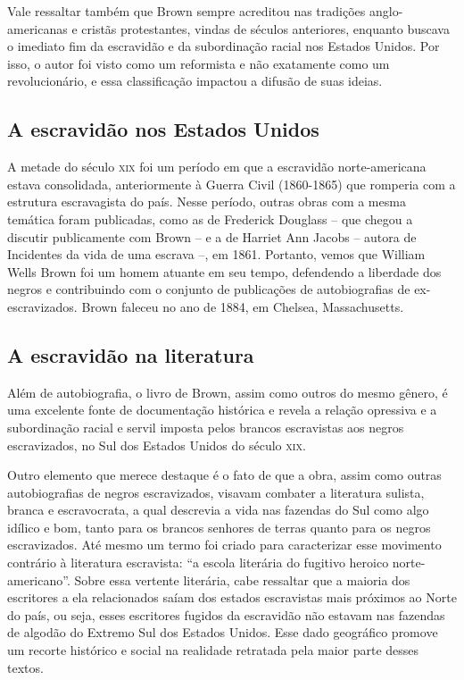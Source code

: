\documentclass[11pt]{extarticle}
\begin{document}
\begin{enumerate}
Vale ressaltar também que Brown sempre acreditou nas tradições
anglo-americanas e cristãs protestantes, vindas de séculos anteriores,
enquanto buscava o imediato fim da escravidão e da subordinação racial
nos Estados Unidos. Por isso, o autor foi visto como um reformista e não
exatamente como um revolucionário, e essa classificação impactou a
difusão de suas ideias.


\subsection{A escravidão nos Estados Unidos}

A metade do século \textsc{xix} foi um período em que a escravidão
norte-americana estava consolidada, anteriormente à Guerra Civil
(1860-1865) que romperia com a estrutura escravagista do país. Nesse
período, outras obras com a mesma temática foram publicadas, como as de
Frederick Douglass -- que chegou a discutir publicamente com Brown -- e
a de Harriet Ann Jacobs -- autora de Incidentes da vida de uma escrava
--, em 1861. Portanto, vemos que William Wells Brown foi um homem
atuante em seu tempo, defendendo a liberdade dos negros e contribuindo
com o conjunto de publicações de autobiografias de ex-escravizados.
Brown faleceu no ano de 1884, em Chelsea, Massachusetts.

\subsection{A escravidão na literatura}

Além de autobiografia, o livro de Brown, assim como outros do mesmo
gênero, é uma excelente fonte de documentação histórica e revela a
relação opressiva e a subordinação racial e servil imposta pelos brancos
escravistas aos negros escravizados, no Sul dos Estados Unidos do século
\textsc{xix}.

Outro elemento que merece destaque é o fato de que a obra, assim como
outras autobiografias de negros escravizados, visavam combater a
literatura sulista, branca e escravocrata, a qual descrevia a vida nas
fazendas do Sul como algo idílico e bom, tanto para os brancos senhores
de terras quanto para os negros escravizados. Até mesmo um termo foi
criado para caracterizar esse movimento contrário à literatura
escravista: ``a escola literária do fugitivo heroico norte-americano''.
Sobre essa vertente literária, cabe ressaltar que a maioria dos
escritores a ela relacionados saíam dos estados escravistas mais
próximos ao Norte do país, ou seja, esses escritores fugidos da
escravidão não estavam nas fazendas de algodão do Extremo Sul dos
Estados Unidos. Esse dado geográfico promove um recorte histórico e
social na realidade retratada pela maior parte desses textos.


\end{enumerate}
\end{document}
